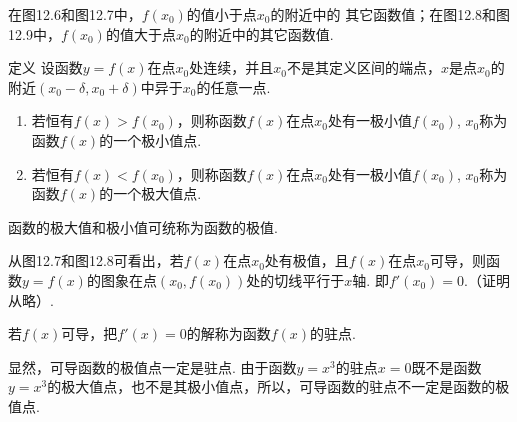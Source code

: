 在图12.6和图12.7中，$f(x_0)$的值小于点$x_0$的附近中的
其它函数值；在图12.8和图12.9中，$f(x_0)$的值大于点$x_0$的附近中的其它函数值.

\begin{thm}
{定义} 设函数$y=f(x)$在点$x_0$处连续，并且$x_0$不是其定义区间的端点，$x$是点$x_0$的附近$(x_0-\delta,x_0+\delta)$中异于$x_0$的任意一点.
\begin{enumerate}[(1)]
\item 若恒有$f(x)>f(x_0)$，则称函数$f(x)$在点$x_0$处有一极小值$f(x_0)$, $x_0$称为函数$f(x)$的一个极小值点.
\item 若恒有$f(x)<f(x_0)$，则称函数$f(x)$在点$x_0$处有一极小值$f(x_0)$, $x_0$称为函数$f(x)$的一个极大值点.
\end{enumerate}
函数的极大值和极小值可统称为函数的极值.
\end{thm}


从图12.7和图12.8可看出，若$f(x)$在点$x_0$处有极值，且$f(x)$在点$x_0$可导，则函数$y=f(x)$的图象在点$(x_0,f(x_0))$处的切线平行于$x$轴. 即$f'(x_0)=0$.（证明从略）.

若$f(x)$可导，把$f'(x)=0$的解称为函数$f(x)$的驻点.

显然，可导函数的极值点一定是驻点. 由于函数$y=x^3$的驻点$x=0$既不是函数$y=x^3$的极大值点，也不是其极小值点，所以，可导函数的驻点不一定是函数的极值点.


